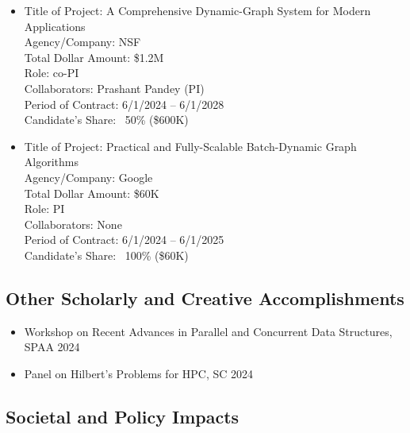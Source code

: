 \begin{adjustwidth}{2em}{0pt}
\begin{itemize}
    \item
    Title of Project: A Comprehensive Dynamic-Graph System for Modern
    Applications \\
    Agency/Company: NSF \\
    Total Dollar Amount: \$1.2M \\
    Role: co-PI \\
    Collaborators: Prashant Pandey (PI) \\
    Period of Contract: 6/1/2024 – 6/1/2028 \\
    Candidate’s Share: ~50\% (\$600K)
     \item
    Title of Project: Practical and Fully-Scalable Batch-Dynamic Graph Algorithms \\
    Agency/Company: Google \\
    Total Dollar Amount: \$60K \\
    Role: PI \\
    Collaborators: None \\
    Period of Contract: 6/1/2024 – 6/1/2025 \\
    Candidate’s Share: ~100\% (\$60K)
\end{itemize}

\end{adjustwidth}

\subsection{Other Scholarly and Creative Accomplishments}

\begin{itemize}
\item Workshop on Recent Advances in Parallel and Concurrent Data Structures,
SPAA 2024
\item Panel on Hilbert's Problems for HPC, SC 2024
\end{itemize}

\subsection{Societal and Policy Impacts}


